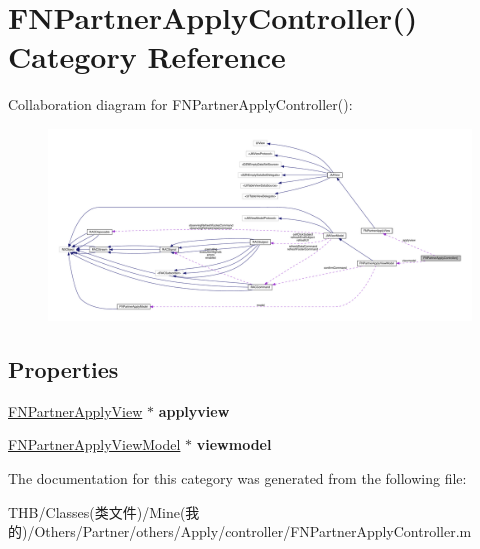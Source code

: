 \hypertarget{category_f_n_partner_apply_controller_07_08}{}\section{F\+N\+Partner\+Apply\+Controller() Category Reference}
\label{category_f_n_partner_apply_controller_07_08}


Collaboration diagram for F\+N\+Partner\+Apply\+Controller()\+:\nopagebreak
\begin{figure}[H]
\begin{center}
\leavevmode
\includegraphics[width=350pt]{category_f_n_partner_apply_controller_07_08__coll__graph}
\end{center}
\end{figure}
\subsection*{Properties}
\begin{DoxyCompactItemize}
\item 
\mbox{\label{category_f_n_partner_apply_controller_07_08_ae49cb5c425ae0129ff2eb2b5a411ddf3}} 
\mbox{\hyperlink{interface_f_n_partner_apply_view}{F\+N\+Partner\+Apply\+View}} $\ast$ {\bfseries applyview}
\item 
\mbox{\label{category_f_n_partner_apply_controller_07_08_a1fcfb899d345e12345ba57541ea6cb35}} 
\mbox{\hyperlink{interface_f_n_partner_apply_view_model}{F\+N\+Partner\+Apply\+View\+Model}} $\ast$ {\bfseries viewmodel}
\end{DoxyCompactItemize}


The documentation for this category was generated from the following file\+:\begin{DoxyCompactItemize}
\item 
T\+H\+B/\+Classes(类文件)/\+Mine(我的)/\+Others/\+Partner/others/\+Apply/controller/F\+N\+Partner\+Apply\+Controller.\+m\end{DoxyCompactItemize}
